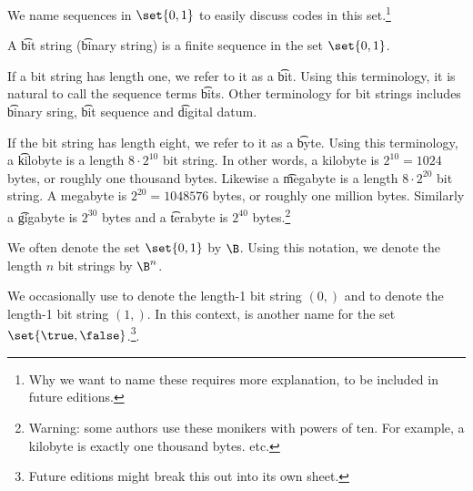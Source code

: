 

We name sequences in $\set{0, 1}$ to easily discuss codes in this set.\footnote{Why we want to name these requires more explanation, to be included in future editions.}


A \t{bit string} (\t{binary string}) is a finite sequence in the set $\set{0, 1}$.

If a bit string has length one, we refer to it as a \t{bit}.
Using this terminology, it is natural to call the sequence terms \t{bits}.
Other terminology for bit strings includes \t{binary sring}, \t{bit sequence} and \t{digital datum}.

If the bit string has length eight, we refer to it as a \t{byte}.
Using this terminology, a \t{kilobyte} is a length $8 \cdot 2^{10}$ bit string.
In other words, a kilobyte is $2^{10} = 1024$ bytes, or roughly one thousand bytes.
Likewise a \t{megabyte} is a length $8 \cdot 2^{20}$ bit string.
A megabyte is $2^{20} = 1048576$ bytes, or roughly one million bytes.
Similarly a \t{gigabyte} is $2^{30}$ bytes and a \t{terabyte} is $2^{40}$ bytes.\footnote{Warning: some authors use these monikers with powers of ten. For example, a kilobyte is exactly one thousand bytes. etc.}


We often denote the set $\set{0,1}$ by $\B$.
Using this notation, we denote the length $n$ bit strings by $\B^n$.

We occasionally use \false to denote the length-1 bit string $(0,)$ and \true to denote the length-1 bit string $(1,)$.
In this context, \bool is another name for the set $\set{\true, \false}$.\footnote{Future editions might break this out into its own sheet.}.

\blankpage
